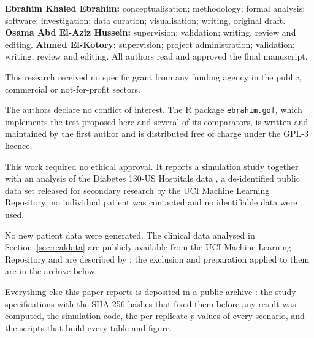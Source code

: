 \documentclass[ASNA]{USG}
\begin{document}
\maketitle

\setcounter{secnumdepth}{3}











\textbf{Ebrahim Khaled Ebrahim:} conceptualisation; methodology; formal analysis; software;
investigation; data curation; visualisation; writing, original draft. \textbf{Osama Abd El-Aziz
Hussein:} supervision; validation; writing, review and editing. \textbf{Ahmed El-Kotory:} supervision;
project administration; validation; writing, review and editing. All authors read and approved the
final manuscript.

This research received no specific grant from any funding agency in the public, commercial or
not-for-profit sectors.

The authors declare no conflict of interest. The R package \texttt{ebrahim.gof}, which implements the
test proposed here and several of its comparators, is written and maintained by the first author and
is distributed free of charge under the GPL-3 licence.

This work required no ethical approval. It reports a simulation study together with an analysis of
the Diabetes 130-US Hospitals data \citep{clore2014uci}, a de-identified public data set released for
secondary research by the UCI Machine Learning Repository; no individual patient was contacted and no
identifiable data were used.

No new patient data were generated. The clinical data analysed in Section~\ref{sec:realdata} are
publicly available from the UCI Machine Learning Repository \citep{clore2014uci} and are described by
\citet{strack2014impact}; the exclusion and preparation applied to them are in the archive below.

Everything else this paper reports is deposited in a public archive \citep{edge2_repro_2026}: the
study specifications with the SHA-256 hashes that fixed them before any result was computed, the
simulation code, the per-replicate $p$-values of every scenario, and the scripts that build every
table and figure.
\end{document}
